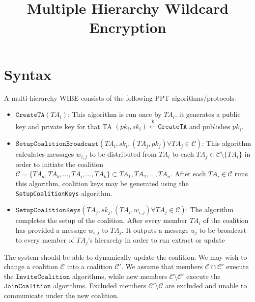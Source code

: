 \documentclass[10pt]{llncs}
\title{Multiple Hierarchy Wildcard Encryption}
\author{ }
\institute{ }
\newcommand{\C}{\mathcal{C}}
\newcommand{\TA}{\mathit{TA}}
\newcommand{\pk}{\mathit{pk}}
\newcommand{\getsr}{\stackrel{{\scriptscriptstyle\$}}{\gets}}
\begin{document}
\maketitle





\section{Syntax}

A multi-hierarchy WIBE consists of the following PPT algorithms/protocols:
\begin{itemize}
\item $\texttt{CreateTA}(\TA_i)$: This algorithm is run once by $\TA_i$, it generates a public key and private key for that TA $(pk_i,sk_i)\getsr \texttt{CreateTA}$ and publishes $\pk_i$.
\medskip

\item $\texttt{SetupCoalitionBroadcast}(\TA_i,sk_{i},(\TA_j,pk_j) \forall \TA_j \in \C)$: This algorithm calculates messages $w_{i,j}$ to be distributed from $\TA_i$ to each $\TA_j \in \C \setminus \{\TA_i\}$ in order to initiate the coalition $\C = \{\TA_a, \TA_b, \ldots, \TA_i, \ldots, \TA_k\} \subset {\TA_1, \TA_2, \ldots, \TA_n}$. After each $\TA_i \in \C$ runs this algorithm, coalition keys may be generated using the \texttt{SetupCoalitionKeys} algorithm.\medskip

\item $\texttt{SetupCoalitionKeys}(\TA_j,sk_j,(\TA_i,w_{i,j}) \forall \TA_j \in \C)$: The algorithm completes the setup of the coalition. After every member $\TA_{i}$ of the coalition has provided a message $w_{i,j}$ to $\TA_j$. It outputs a message $u_j$ to be broadcast to every member of $\TA_j$'s hierarchy in order to run extract or update 
\end{itemize}

The system should be able to dynamically update the coalition. We may wish to change a coalition $\C$ into a coalition $\C'$. We assume that members $\C \cap \C'$ execute the $\texttt{InviteCoalition}$ algorithms, while new members $\C\setminus \C'$ execute the $\texttt{JoinCoalition}$ algorithms. Excluded members $\C'\setminus \C$ are excluded and unable to communicate under the new coalition.
\end{document}
